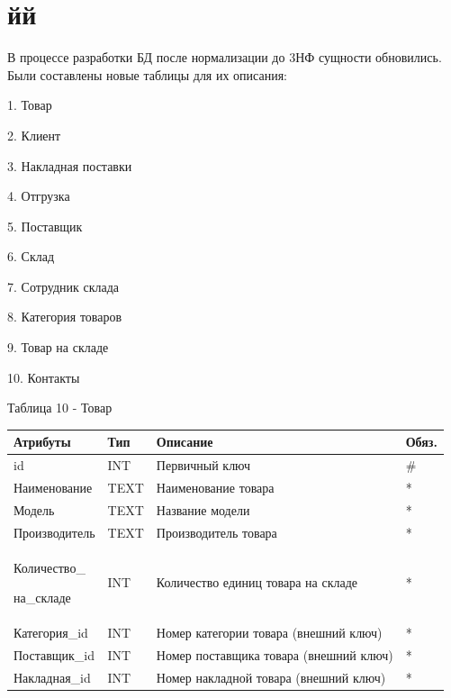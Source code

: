 \documentclass[14pt]{extreport}
\begin{document}
\section{йй}
В процессе разработки БД после нормализации до 3НФ сущности обновились. Были составлены новые таблицы для их описания: 

1. Товар


2. Клиент


3. Накладная поставки


4. Отгрузка


5. Поставщик


6. Склад


7. Сотрудник склада


8. Категория товаров 


9. Товар на складе


10. Контакты


\vspace{1em}
\noindent
Таблица 10 - Товар
\begin{center}
\begin{longtable}{ |m{3.3cm}|m{3cm}|m{6cm}|m{1.8cm}| } 
 \hline
 Атрибуты & Тип & Описание & Обяз. \\ [0.5ex] 
 \hline\hline
 id & INT & Первичный ключ & \# \\
 \hline
 Наименование & TEXT & Наименование товара & * \\
 \hline
 Модель & TEXT & Название модели & * \\
 \hline
 Производитель & TEXT & Производитель товара & *\\ 
 \hline
 Количество\_
 
 на\_складе & INT & Количество единиц товара на складе & * \\
 \hline
 Категория\_id & INT & Номер категории товара (внешний ключ) & * \\ 
 \hline
 Поставщик\_id & INT & Номер поставщика товара (внешний ключ) & * \\ 
 \hline
 Накладная\_id & INT & Номер накладной товара (внешний ключ) & * \\ 
 \hline

 \hline
\end{longtable}
\end{center}


\newpage
\end{document}
